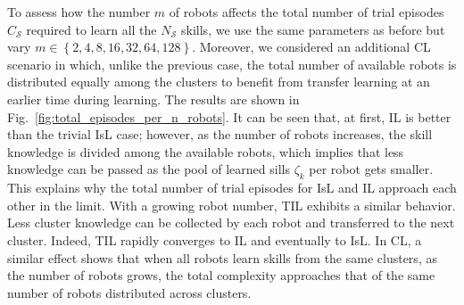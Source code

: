 \documentclass[12pt]{article}
\begin{document}
To assess how the number $m$ of robots affects the total number of trial episodes $C_\mathcal{S}$ required to learn all the $N_\mathcal{S}$ skills, we use the same parameters as before but vary $m \in \left \lbrace 2,4,8,16,32,64,128\right \rbrace$. Moreover, we considered an additional CL scenario in which, unlike the previous case, the total number of available robots is distributed equally among the clusters to benefit from transfer learning at an earlier time during learning. The results are shown in Fig.~\ref{fig:total_episodes_per_n_robots}. It can be seen that, at first, IL is better than the trivial IsL case; however, as the number of robots increases, the skill knowledge is divided among the available robots, which implies that less knowledge can be passed as the pool of learned sills $\zeta_k$ per robot gets smaller. This explains why the total number of trial episodes for IsL and IL approach each other in the limit. With a growing robot number, TIL exhibits a similar behavior. Less cluster knowledge can be collected by each robot and transferred to the next cluster. Indeed, TIL rapidly converges to IL and eventually to IsL. In CL, a similar effect shows that when all robots learn skills from the same clusters, as the number of robots grows, the total complexity approaches that of the same number of robots distributed across clusters.
\end{document}
